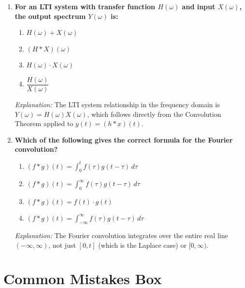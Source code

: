\documentclass[12pt,a4paper]{article}
\begin{document}
\begin{enumerate}[label=\textbf{MCQ \arabic*.}, leftmargin=*, itemsep=12pt]
\item \textbf{For an LTI system with transfer function $H(\omega)$ and input $X(\omega)$,
  the output spectrum $Y(\omega)$ is:}
  \begin{enumerate}[label=(\alph*)]
    \item $H(\omega)+X(\omega)$
    \item $(H*X)(\omega)$
    \item \textbf{$H(\omega)\cdot X(\omega)$}
    \item $\dfrac{H(\omega)}{X(\omega)}$
  \end{enumerate}
  \textit{Explanation:} The LTI system relationship in the frequency domain is
  $Y(\omega)=H(\omega)X(\omega)$, which follows directly from the Convolution
  Theorem applied to $y(t)=(h*x)(t)$.

\item \textbf{Which of the following gives the correct formula for the Fourier convolution?}
  \begin{enumerate}[label=(\alph*)]
    \item $(f*g)(t) = \int_0^t f(\tau)g(t-\tau)\,d\tau$
    \item $(f*g)(t) = \int_0^\infty f(\tau)g(t-\tau)\,d\tau$
    \item $(f*g)(t) = f(t)\cdot g(t)$
    \item \textbf{$(f*g)(t) = \int_{-\infty}^{\infty}f(\tau)g(t-\tau)\,d\tau$}
  \end{enumerate}
  \textit{Explanation:} The Fourier convolution integrates over the entire real
  line $(-\infty,\infty)$, not just $[0,t]$ (which is the Laplace case) or
  $[0,\infty)$.

\end{enumerate}

\section{Common Mistakes Box}
\end{document}
